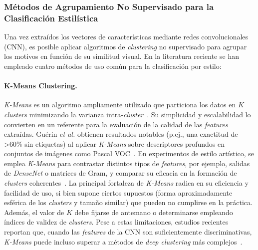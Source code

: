 \subsubsection{Métodos de Agrupamiento No Supervisado para la Clasificación Estilística }

Una vez extraídos los vectores de características mediante redes convolucionales (CNN), es posible aplicar algoritmos de \textit{clustering} no supervisado para agrupar los motivos en función de su similitud visual.
En la literatura reciente se han empleado cuatro métodos de uso común para la clasificación por estilo:

\paragraph{K-Means Clustering.}
\textit{K-Means} es un algoritmo ampliamente utilizado que particiona los datos en $K$ \textit{clusters} minimizando la varianza intra-\textit{cluster}~\cite{guerin2018,dangeti2024}.
Su simplicidad y escalabilidad lo convierten en un referente para la evaluación de la calidad de las \textit{features} extraídas. Guérin \textit{et al.} obtienen resultados notables (p.ej., una exactitud de \textgreater 60\% sin etiquetas) al aplicar \textit{K-Means} sobre descriptores profundos en conjuntos de imágenes como Pascal VOC~\cite{guerin2018}.
En experimentos de estilo artístico, se emplea \textit{K-Means} para contrastar distintos tipos de \textit{features}, por ejemplo, salidas de \textit{DenseNet} o matrices de Gram, y comparar su eficacia en la formación de \textit{clusters} coherentes~\cite{dangeti2024}.
La principal fortaleza de \textit{K-Means} radica en su eficiencia y facilidad de uso, si bien supone ciertos supuestos (forma aproximadamente esférica de los \textit{clusters} y tamaño similar) que pueden no cumplirse en la práctica.
Además, el valor de $K$ debe fijarse de antemano o determinarse empleando índices de validez de \textit{clusters}.
Pese a estas limitaciones, estudios recientes reportan que, cuando las \textit{features} de la CNN son suficientemente discriminativas, \textit{K-Means} puede incluso superar a métodos de \textit{deep clustering} más complejos~\cite{dangeti2024}.

